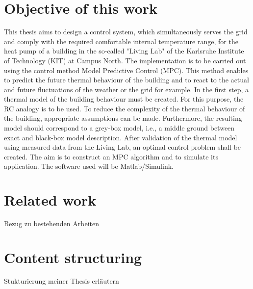 \section{Objective of this work}
\label{section:obejective}
    This thesis aims to design a control system, which simultaneously serves the grid and comply with the required comfortable internal temperature range, for the heat pump of a building in the so-called "Living Lab" of the Karlsruhe Institute of Technology (KIT) at Campus North. The implementation is to be carried out using the control method Model Predictive Control (MPC). This method enables to predict the future thermal behaviour of the building and to react to the actual and future fluctuations of the weather or the grid for example. 
    In the first step, a thermal model of the building behaviour must be created. For this purpose, the RC analogy is to be used. To reduce the complexity of the thermal behaviour of the building, appropriate assumptions can be made. Furthermore, the resulting model should correspond to a grey-box model, i.e., a middle ground between exact and black-box model description. After validation of the thermal model using measured data from the Living Lab, an optimal control problem shall be created. The aim is to construct an MPC algorithm and to simulate its application. The software used will be Matlab/Simulink.

\section{Related work}
\label{section:relatedwork}
Bezug zu bestehenden Arbeiten
\section{Content structuring}
\label{section:contentstructuring}
Stukturierung meiner Thesis erläutern

%
%
%
